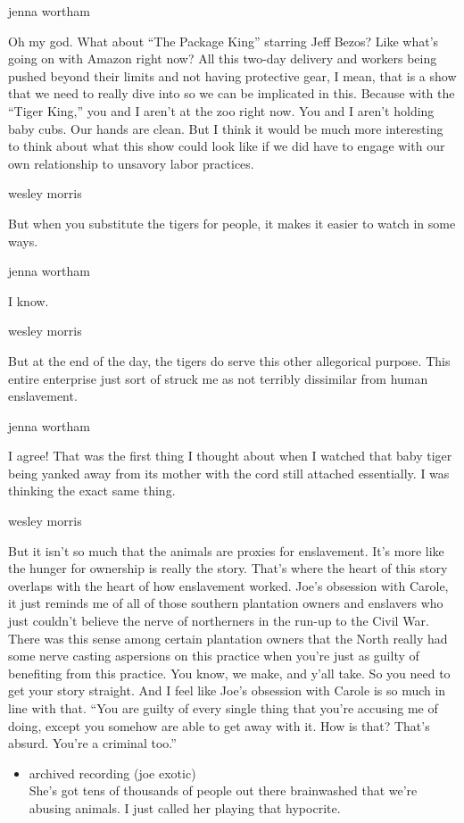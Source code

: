 jenna wortham

Oh my god. What about ``The Package King'' starring Jeff Bezos? Like
what's going on with Amazon right now? All this two-day delivery and
workers being pushed beyond their limits and not having protective gear,
I mean, that is a show that we need to really dive into so we can be
implicated in this. Because with the ``Tiger King,'' you and I aren't at
the zoo right now. You and I aren't holding baby cubs. Our hands are
clean. But I think it would be much more interesting to think about what
this show could look like if we did have to engage with our own
relationship to unsavory labor practices.

wesley morris

But when you substitute the tigers for people, it makes it easier to
watch in some ways.

jenna wortham

I know.

wesley morris

But at the end of the day, the tigers do serve this other allegorical
purpose. This entire enterprise just sort of struck me as not terribly
dissimilar from human enslavement.

jenna wortham

I agree! That was the first thing I thought about when I watched that
baby tiger being yanked away from its mother with the cord still
attached essentially. I was thinking the exact same thing.

wesley morris

But it isn't so much that the animals are proxies for enslavement. It's
more like the hunger for ownership is really the story. That's where the
heart of this story overlaps with the heart of how enslavement worked.
Joe's obsession with Carole, it just reminds me of all of those southern
plantation owners and enslavers who just couldn't believe the nerve of
northerners in the run-up to the Civil War. There was this sense among
certain plantation owners that the North really had some nerve casting
aspersions on this practice when you're just as guilty of benefiting
from this practice. You know, we make, and y'all take. So you need to
get your story straight. And I feel like Joe's obsession with Carole is
so much in line with that. ``You are guilty of every single thing that
you're accusing me of doing, except you somehow are able to get away
with it. How is that? That's absurd. You're a criminal too.''

\begin{itemize}
\tightlist
\item
  archived recording (joe exotic)\\
  She's got tens of thousands of people out there brainwashed that we're
  abusing animals. I just called her playing that hypocrite.
\end{itemize}

